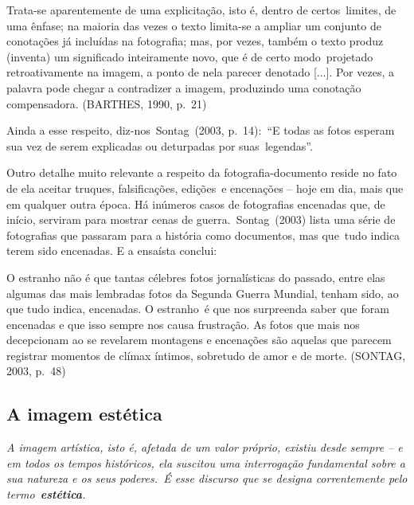 \documentclass[
  letterpaper,
  a4paper,
  12pt]{scrbook}
\renewenvironment{quote}
  {\par\singlespacing\small\list{}{\rightmargin=0cm \leftmargin=4cm}%
   \item\relax}
  {\endlist}
\begin{document}
\begin{quote}
Trata-se aparentemente de uma explicitação, isto é, dentro de
certos~limites, de uma ênfase; na maioria das vezes o texto limita-se a
ampliar um conjunto de conotações já incluídas na fotografia; mas, por
vezes, também o texto produz (inventa) um significado inteiramente novo,
que é de certo modo~projetado retroativamente na imagem, a ponto de nela
parecer denotado {[}...{]}. Por vezes, a palavra pode chegar a
contradizer a imagem, produzindo uma conotação compensadora. (BARTHES,
1990, p.~21)~ ~
\end{quote}

Ainda a esse respeito, diz-nos~Sontag~(2003, p.~14):~``E todas as fotos
esperam sua vez de serem explicadas ou deturpadas por suas~legendas''.

Outro detalhe muito relevante a respeito da fotografia-documento reside
no fato de ela aceitar truques, falsificações, edições~e encenações --
hoje em dia, mais que em qualquer outra época. Há inúmeros casos de
fotografias encenadas que, de início, serviram para mostrar cenas de
guerra.~Sontag~(2003) lista uma série de fotografias que passaram para a
história como documentos, mas que~tudo indica terem sido encenadas. E a
ensaísta conclui:~ ~

\begin{quote}
O estranho não é que tantas célebres fotos jornalísticas do passado,
entre elas algumas das mais lembradas fotos da Segunda Guerra Mundial,
tenham sido, ao que tudo indica, encenadas. O estranho~é que nos
surpreenda saber que foram encenadas e que isso sempre nos causa
frustração. As fotos que mais nos decepcionam ao se revelarem montagens
e encenações são aquelas que parecem registrar momentos de clímax
íntimos, sobretudo de amor e de morte. (SONTAG, 2003, p.~48)~ ~
\end{quote}

\hypertarget{a-imagem-estuxe9tica}{%
\subsection{A imagem estética}\label{a-imagem-estuxe9tica}}

\begin{quote}
\emph{A imagem artística, isto é, afetada de um valor próprio, existiu
desde sempre -- e em todos os tempos históricos, ela suscitou uma
interrogação fundamental sobre a sua natureza e os seus poderes.~É esse
discurso que se designa correntemente pelo termo~\textbf{estética}.}
\end{quote}
\end{document}
